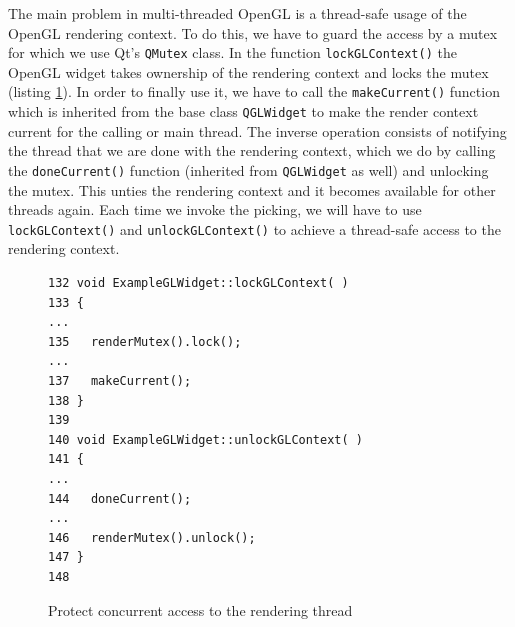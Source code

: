 \documentclass[jou,noapacite]{apa}
\begin{document}
%
%
The main problem in multi-threaded OpenGL is a thread-safe usage of the OpenGL
rendering context.
%
To do this, we have to guard the access by a mutex for which we use
Qt's \lstinline|QMutex| class.
%
In the function \lstinline|lockGLContext()| the OpenGL widget takes ownership of
the rendering context and locks the mutex (listing \ref{lst:concur}).
%
In order to finally use it, we have to call the \lstinline|makeCurrent()|
function which is inherited from the base class \lstinline|QGLWidget| to make
the render context current for the calling or main thread.
%
The inverse operation consists of notifying the thread that we are done with
the rendering context, which we do by calling the \lstinline|doneCurrent()|
function (inherited from \lstinline|QGLWidget| as well) and unlocking the
mutex.
%
This unties the rendering context and it becomes available for other threads
again.
%
Each time we invoke the picking, we will have to use \lstinline|lockGLContext()|
and \lstinline|unlockGLContext()| to achieve a thread-safe access to the
rendering context.
\begin{figure}[h]
\begin{lstlisting}[basicstyle=\scriptsize]
132 void ExampleGLWidget::lockGLContext( )
133 {
...
135   renderMutex().lock();
...
137   makeCurrent();
138 }
139
140 void ExampleGLWidget::unlockGLContext( )
141 {
...
144   doneCurrent();
...
146   renderMutex().unlock();
147 }
148
\end{lstlisting}
\caption{Protect concurrent access to the rendering thread}
\label{lst:concur}
\end{figure}
\end{document}
